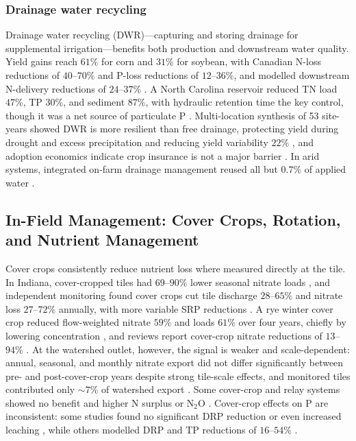 \subsubsection{Drainage water recycling}

Drainage water recycling (DWR)---capturing and storing drainage for
supplemental irrigation---benefits both production and downstream water
quality. Yield gains reach $61\%$ for corn and $31\%$ for soybean, with
Canadian N-loss reductions of $40$--$70\%$ and P-loss reductions of
$12$--$36\%$, and modelled downstream N-delivery reductions of $24$--$37\%$
\parencite{Hay2021}. A North Carolina reservoir reduced TN load $47\%$, TP
$30\%$, and sediment $87\%$, with hydraulic retention time the key control,
though it was a net source of particulate P \parencite{Moursi2023,Moursi2022}.
Multi-location synthesis of 53 site-years showed DWR is more resilient than
free drainage, protecting yield during drought and excess precipitation and
reducing yield variability $22\%$ \parencite{Willison2021}, and adoption
economics indicate crop insurance is not a major barrier \parencite{Sellars2022}.
In arid systems, integrated on-farm drainage management reused all but
$0.7\%$ of applied water \parencite{Ayars2014,Kosari2024}.

\subsection{In-Field Management: Cover Crops, Rotation, and Nutrient Management}

Cover crops consistently reduce nutrient loss where measured directly at the
tile. In Indiana, cover-cropped tiles had $69$--$90\%$ lower seasonal nitrate
loads \parencite{Hanrahan2018}, and independent monitoring found cover crops
cut tile discharge $28$--$65\%$ and nitrate loss $27$--$72\%$ annually, with
more variable SRP reductions \parencite{Speir2022,Trentman2020}. A rye winter
cover crop reduced flow-weighted nitrate $59\%$ and loads $61\%$ over four
years, chiefly by lowering concentration \parencite{Kaspar2007}, and reviews
report cover-crop nitrate reductions of $13$--$94\%$ \parencite{Ward2018}. At
the watershed outlet, however, the signal is weaker and scale-dependent:
annual, seasonal, and monthly nitrate export did not differ significantly
between pre- and post-cover-crop years despite strong tile-scale effects, and
monitored tiles contributed only $\sim7\%$ of watershed export
\parencite{Hanrahan2018,Speir2022}. Some cover-crop and relay systems showed
no benefit and higher N surplus or N$_2$O
\parencite{Emmett2022,Askar2023}. Cover-crop effects on P are inconsistent:
some studies found no significant DRP reduction or even increased leaching
\parencite{deOliveira2022,Liu2019}, while others modelled DRP and TP reductions
of $16$--$54\%$ \parencite{Grewal2025,Askar2021b}.

